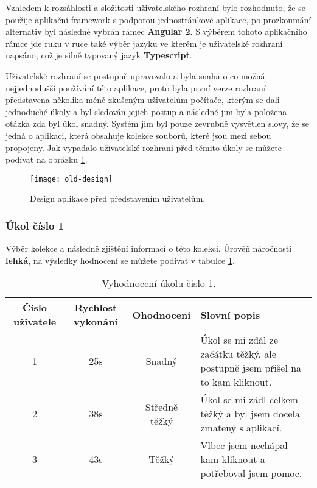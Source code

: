 \par Vzhledem k rozsáhlosti a složitosti uživatelského rozhraní bylo rozhodnuto, že se použije aplikační framework s podporou jednostránkové aplikace, po prozkoumání alternativ byl následně vybrán rámec \textbf{Angular 2}. S výběrem tohoto aplikačního rámce jde ruku v ruce také výběr jazyku ve kterém je uživatelské rozhraní napsáno, což je silně typovaný jazyk \textbf{Typescript}.

\par Uživatelské rozhraní se postupně upravovalo a byla snaha o co možná nejjednodušší používání této aplikace, proto byla první verze rozhraní představena několika méně zkušeným uživatelům počítače, kterým se dali jednoduché úkoly a byl sledován jejich postup a následně jim byla položena otázka zda byl úkol snadný. Systém jim byl pouze zevrubně vysvětlen slovy, že se jedná o aplikaci, která obsahuje kolekce souborů, které jsou mezi sebou propojeny. Jak vypadalo uživatelské rozhraní před těmito úkoly se můžete podívat na obrázku \ref{old-ui}.

\begin{figure}[!h]
\centering
\texttt{[image: old-design]}
\caption{Design aplikace před představením uživatelům.}
\label{old-ui}
\end{figure}

\subsubsection{Úkol číslo 1} Výběr kolekce a následně zjištění informací o této kolekci. Úrověň náročnosti \textbf{lehká}, na výsledky hodnocení se můžete podívat v tabulce \ref{ukol-1}.
\begin{table}[htp]
\begin{center}
\begin{tabular}{ || c || c | c | m{5cm} || } 
\hline
Číslo uživatele & Rychlost vykonání & Ohodnocení & Slovní popis \\ [0.5ex] 
\hline
\hline
1 & 25s & Snadný & Úkol se mi zdál ze začátku těžký, ale postupně jsem přišel na to kam kliknout. \\ 
\hline
2 & 38s & Středně těžký & Úkol se mi zádl celkem těžký a byl jsem docela zmatený s aplikací. \\
\hline
3 & 43s & Těžký & Vlbec jsem nechápal kam kliknout a potřeboval jsem pomoc. \\
\hline
\end{tabular}
\end{center}
\caption{Vyhodnocení úkolu číslo 1.}
\label{ukol-1}
\end{table}
